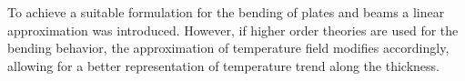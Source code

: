 To achieve a suitable formulation for the bending of plates and beams a linear approximation was introduced. However, if higher order theories are used for the bending behavior, the approximation of temperature field modifies accordingly, allowing for a better representation of temperature trend along the thickness.






